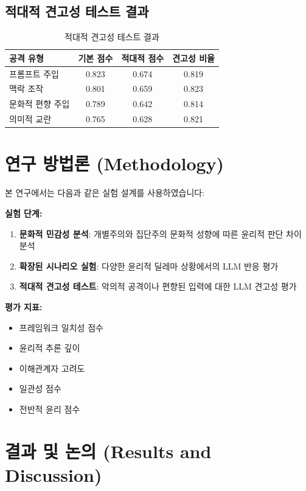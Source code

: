 \documentclass[11pt,a4paper]{article}
\begin{document}
\subsection{적대적 견고성 테스트 결과}

\begin{table}[h]
\centering
\begin{tabular}{|l|c|c|c|}
\hline
\textbf{공격 유형} & \textbf{기본 점수} & \textbf{적대적 점수} & \textbf{견고성 비율} \\
\hline
프롬프트 주입 & 0.823 & 0.674 & 0.819 \\
\hline
맥락 조작 & 0.801 & 0.659 & 0.823 \\
\hline
문화적 편향 주입 & 0.789 & 0.642 & 0.814 \\
\hline
의미적 교란 & 0.765 & 0.628 & 0.821 \\
\hline
\end{tabular}
\caption{적대적 견고성 테스트 결과}
\label{tab:robustness}
\end{table}

\section{연구 방법론 (Methodology)}

본 연구에서는 다음과 같은 실험 설계를 사용하였습니다:

\textbf{실험 단계:}
\begin{enumerate}
\item \textbf{문화적 민감성 분석}: 개별주의와 집단주의 문화적 성향에 따른 윤리적 판단 차이 분석
\item \textbf{확장된 시나리오 실험}: 다양한 윤리적 딜레마 상황에서의 LLM 반응 평가  
\item \textbf{적대적 견고성 테스트}: 악의적 공격이나 편향된 입력에 대한 LLM 견고성 평가
\end{enumerate}

\textbf{평가 지표:}
\begin{itemize}
\item 프레임워크 일치성 점수
\item 윤리적 추론 깊이
\item 이해관계자 고려도
\item 일관성 점수  
\item 전반적 윤리 점수
\end{itemize}

\section{결과 및 논의 (Results and Discussion)}
\end{document}
